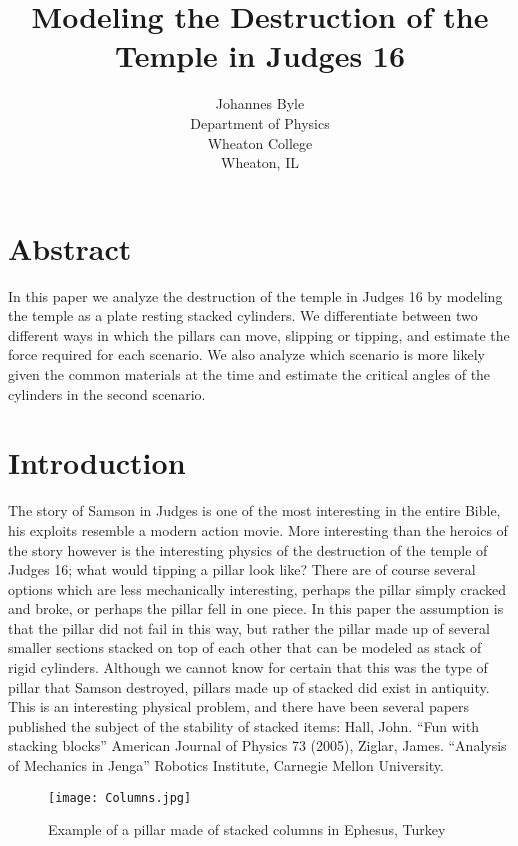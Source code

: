 \documentclass[two column]{article}
\begin{document}
\title{Modeling the Destruction of the Temple in Judges 16}
\author{Johannes Byle\\Department of Physics\\Wheaton College\\Wheaton, IL}
\maketitle
\section{Abstract}
In this paper we analyze the destruction of the temple in Judges 16 by modeling the temple as a plate resting stacked cylinders. We differentiate between two different ways in which the pillars can move, slipping or tipping, and estimate the force required for each scenario. We also analyze which scenario is more likely given the common materials at the time and estimate the critical angles of the cylinders in the second scenario.
\section{Introduction}
The story of Samson in Judges is one of the most interesting in the entire Bible, his exploits resemble a modern action movie. More interesting than the heroics of the story however is the interesting physics of the destruction of the temple of Judges 16; what would tipping a pillar look like? There are of course several options which are less mechanically interesting, perhaps the pillar simply cracked and broke, or perhaps the pillar fell in one piece. In this paper the assumption is that the pillar did not fail in this way, but rather the pillar made up of several smaller sections stacked on top of each other that can be modeled as stack of rigid cylinders. Although we cannot know for certain that this was the type of pillar that Samson destroyed, pillars made up of stacked did exist in antiquity. This is an interesting physical problem, and there have been several papers published the subject of the stability of stacked items: Hall, John. “Fun with stacking blocks” American Journal of Physics 73 (2005), Ziglar, James. “Analysis of Mechanics in Jenga” Robotics Institute, Carnegie Mellon University.

\begin{figure}
\texttt{[image: Columns.jpg]}
\caption{Example of a pillar made of stacked columns in Ephesus, Turkey}
\end{figure}
\end{document}
